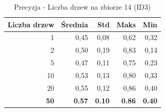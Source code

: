\begin{table}[htbp]
\centering
\small
\setlength{\tabcolsep}{6pt}
\renewcommand{\arraystretch}{1.2}
\caption{Precyzja - Liczba drzew na zbiorze 14 (ID3)}
\label{tab:ID3_tree_count_14_precision}
\begin{tabular}{r|r|r|r|r}
\toprule
Liczba drzew & Średnia & Std & Maks & Min \\
\hline
1 & 0,45 & 0,08 & 0,62 & 0,32 \\
2 & 0,50 & 0,19 & 0,83 & 0,14 \\
5 & 0,47 & 0,11 & 0,75 & 0,23 \\
10 & 0,53 & 0,13 & 0,80 & 0,33 \\
20 & 0,55 & 0,12 & 0,86 & 0,40 \\
\textbf{50} & \textbf{0.57} & \textbf{0.10} & \textbf{0.86} & \textbf{0.40} \\
\bottomrule
\end{tabular}
\end{table}